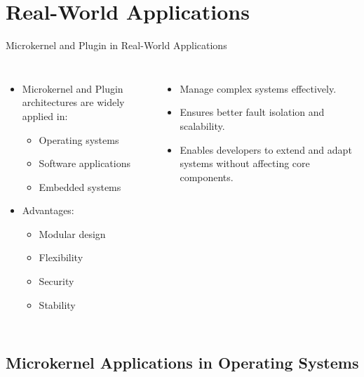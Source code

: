 \documentclass[aspectratio=169, table]{beamer}
\begin{document}
\section{Real-World Applications}

\begin{frame}{Microkernel and Plugin in Real-World Applications}
\begin{columns}
\begin{itemize}
	\item Microkernel and Plugin architectures are widely applied in:
	\begin{itemize}
		\item Operating systems
		\item Software applications
		\item Embedded systems
	\end{itemize}
	\item Advantages:
	\begin{itemize}
		\item Modular design
		\item Flexibility
		\item Security
		\item Stability
	\end{itemize}
\end{itemize}
\begin{itemize}
	\item Manage complex systems effectively.
	\item Ensures better fault isolation and scalability.
	\item Enables developers to extend and adapt systems without affecting core components.
\end{itemize}
\end{columns}
\end{frame}

\subsection{Microkernel Applications in Operating Systems}
\end{document}
